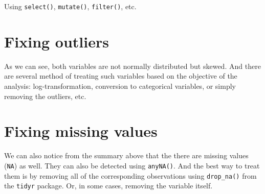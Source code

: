 \documentclass[
]{book}
\newenvironment{Shaded}{\begin{snugshade}}{\end{snugshade}}
\newcommand{\CommentTok}[1]{\textcolor[rgb]{0.56,0.35,0.01}{\textit{#1}}}
\newcommand{\DataTypeTok}[1]{\textcolor[rgb]{0.13,0.29,0.53}{#1}}
\newcommand{\DecValTok}[1]{\textcolor[rgb]{0.00,0.00,0.81}{#1}}
\newcommand{\KeywordTok}[1]{\textcolor[rgb]{0.13,0.29,0.53}{\textbf{#1}}}
\newcommand{\NormalTok}[1]{#1}
\newcommand{\OperatorTok}[1]{\textcolor[rgb]{0.81,0.36,0.00}{\textbf{#1}}}
\newcommand{\OtherTok}[1]{\textcolor[rgb]{0.56,0.35,0.01}{#1}}
\newcommand{\StringTok}[1]{\textcolor[rgb]{0.31,0.60,0.02}{#1}}
\begin{document}
\begin{Shaded}
\end{Shaded}

Using \texttt{select()}, \texttt{mutate()}, \texttt{filter()}, etc.

\hypertarget{fixing-outliers}{%
\section{Fixing outliers}\label{fixing-outliers}}

As we can see, both variables are not normally distributed but skewed. And there are several method of treating such variables based on the objective of the analysis: log-transformation, conversion to categorical variables, or simply removing the outliers, etc.

\hypertarget{fixing-missing-values}{%
\section{Fixing missing values}\label{fixing-missing-values}}

We can also notice from the summary above that the there are missing values (\texttt{NA}) as well. They can also be detected using \texttt{anyNA()}. And the best way to treat them is by removing all of the corresponding observations using \texttt{drop\_na()} from the \texttt{tidyr} package. Or, in some cases, removing the variable itself.
\end{document}
